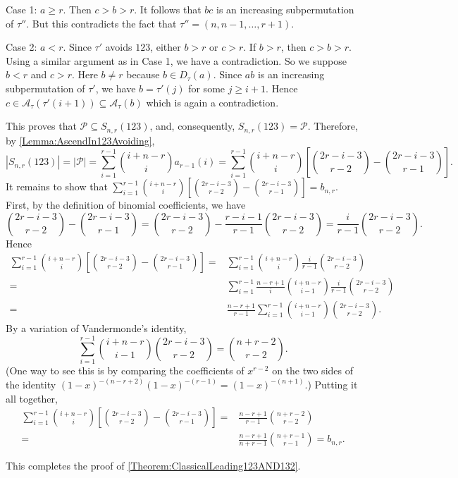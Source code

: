 \documentclass[11pt]{article}
\theoremstyle{definition}
\numberwithin{equation}{section}
\begin{document}
Case 1: $a\geq r$. Then $c>b>r$. It follows that $bc$ is an increasing subpermutation of $\tau''$. But this contradicts the fact that $\tau''=(n,n-1,\ldots,r+1)$.

Case 2: $a<r$. Since $\tau'$ avoids $123$, either $b>r$ or $c>r$. If $b>r$, then $c>b>r$. Using a similar argument as in Case 1, we have a contradiction. So we suppose $b<r$ and $c>r$. Here $b\neq r$ because $b\in D_\tau(a)$. Since $ab$ is an increasing subpermutation of $\tau'$, we have $b=\tau'(j)$ for some $j\geq i+1$. Hence $c\in \mathcal{A}_\tau(\tau'(i+1)) \subseteq \mathcal{A}_\tau(b)$ which is again a contradiction.

This proves that $\mathcal{P}\subseteq S_{n,r}(123)$, and, consequently, 
$S_{n,r}(123)=\mathcal{P}$. Therefore, by \cref{Lemma:AscendIn123Avoiding},  \[
|S_{n, r}(123)|=|\mathcal{P}|=\sum_{i=1}^{r-1}\binom{i+n-r}{i}a_{r-1}(i)=\sum_{i=1}^{r-1}\binom{i+n-r}{i}\left[\binom{2r-i-3}{r-2}-\binom{2r-i-3}{r-1}\right].\]
It remains to show that $\sum_{i=1}^{r-1}\binom{i+n-r}{i}\left[\binom{2r-i-3}{r-2}-\binom{2r-i-3}{r-1}\right]=b_{n,r}$. First, by the definition of binomial coefficients, we have
\[
\binom{2r-i-3}{r-2}-\binom{2r-i-3}{r-1}=\binom{2r-i-3}{r-2}-\frac{r-i-1}{r-1}\binom{2r-i-3}{r-2}=\frac{i}{r-1}\binom{2r-i-3}{r-2}.
\]
Hence
\[
\begin{split}
\sum_{i=1}^{r-1}\binom{i+n-r}{i}\left[\binom{2r-i-3}{r-2}-\binom{2r-i-3}{r-1}\right]=&\sum_{i=1}^{r-1}\binom{i+n-r}{i}\frac{i}{r-1}\binom{2r-i-3}{r-2}\\=&\sum_{i=1}^{r-1}\frac{n-r+1}{i}\binom{i+n-r}{i-1}\frac{i}{r-1}\binom{2r-i-3}{r-2}\\=&\frac{n-r+1}{r-1}\sum_{i=1}^{r-1}\binom{i+n-r}{i-1}\binom{2r-i-3}{r-2}.
\end{split}
\]
By a variation of Vandermonde's identity,
\[
\sum_{i=1}^{r-1} \binom{i+n-r}{i-1} \binom{2r-i-3}{r-2} = \binom{n+r-2}{r-2}.
\]
(One way to see this is by comparing the coefficients of $x^{r-2}$ on the two sides of the identity
$(1-x)^{-(n-r+2)} (1-x)^{-(r-1)} = (1-x)^{-(n+1)}$.)
Putting it all together,
\[
\begin{split}
\sum_{i=1}^{r-1}\binom{i+n-r}{i}\left[\binom{2r-i-3}{r-2}-\binom{2r-i-3}{r-1}\right]=&\frac{n-r+1}{r-1}\binom{n+r-2}{r-2}\\=&\frac{n-r+1}{n+r-1}\binom{n+r-1}{r-1}=b_{n,r}.
\end{split}
\]

This completes the proof of \cref{Theorem:ClassicalLeading123AND132}.


\end{document}
